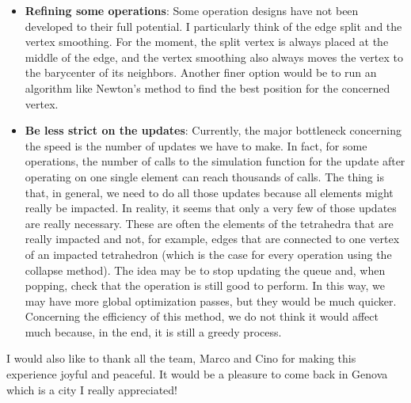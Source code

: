 \documentclass[11pt]{article}
\begin{document}
\begin{itemize}

	\item \textbf{Refining some operations}: Some operation designs have not been developed to their full potential. I particularly think of the edge split and the vertex smoothing. For the moment, the split vertex is always placed at the middle of the edge, and the vertex smoothing also always moves the vertex to the barycenter of its neighbors. Another finer option would be to run an algorithm like Newton's method to find the best position for the concerned vertex.

	\item \textbf{Be less strict on the updates}: Currently, the major bottleneck concerning the speed is the
	      number of updates we have to make. In fact, for some operations, the number of calls to the simulation
	      function for the update after operating on one single element can reach thousands of calls. The thing
	      is that, in general, we need to do all those updates because all elements might really be impacted.
	      In reality, it seems that only a very few of those updates are really necessary. These are often the
	      elements of the tetrahedra that are really impacted and not, for example, edges that are connected
	      to one vertex of an impacted tetrahedron (which is the case for every operation using the collapse
	      method). The idea may be to stop updating the queue and, when popping, check that the operation is
	      still good to perform. In this way, we may have more global optimization passes, but they would be
	      much quicker. Concerning the efficiency of this method, we do not think it would affect much
	      because, in the end, it is still a greedy process.

\end{itemize}

I would also like to thank all the team, Marco and Cino for making this experience joyful and peaceful. It would be a pleasure
to come back in Genova which is a city I really appreciated!

\newpage

\printbibliography
\end{document}
